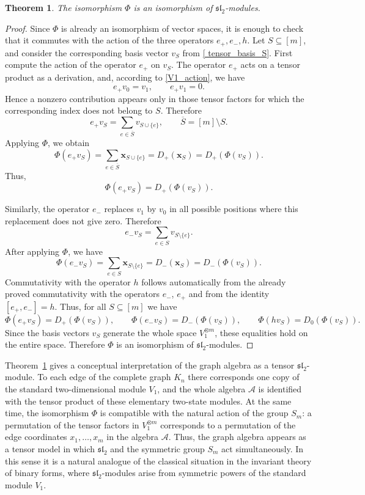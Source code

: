 \documentclass[12pt,reqno]{amsart}
\newtheorem{theorem}{Theorem}[section]
\begin{document}
\begin{theorem}\label{A_tensor_power}
The isomorphism $\Phi$ is an isomorphism of $\mathfrak{sl}_2$-modules.
\end{theorem}

\begin{proof}
Since $\Phi$ is already an isomorphism of vector spaces, it is enough to
check that it commutes with the action of the three operators $e_+,e_-,h$.
Let $S\subseteq[m]$, and consider the corresponding basis vector $v_S$ from
\eqref{ tensor_basis_S}.
First compute the action of the operator $e_+$ on $v_S$.
The operator $e_+$ acts on a tensor product as a derivation, and, according
to \eqref{V1_action}, we have
$$
e_+v_0=v_1,\qquad e_+v_1=0.
$$
Hence a nonzero contribution appears only in those tensor factors for which
the corresponding index does not belong to $S$.
Therefore
$$
e_+v_S=\sum_{e\in \overline S} v_{S\cup\{e\}},
\qquad
\overline S=[m]\setminus S.
$$
Applying $\Phi$, we obtain
$$
\Phi(e_+v_S)=\sum_{e\in\overline S}\boldsymbol{x}_{S\cup\{e\}}=D_+(\boldsymbol{x}_S)=D_+(\Phi(v_S)).
$$
Thus,
$$
\Phi(e_+v_S)=D_+(\Phi(v_S)).
$$

Similarly, the operator $e_-$ replaces $v_1$ by $v_0$ in all possible
positions where this replacement does not give zero.
Therefore
$$
e_-v_S=\sum_{e\in S}v_{S\setminus\{e\}}.
$$
After applying $\Phi$, we have
$$
\Phi(e_-v_S)=\sum_{e\in S}\boldsymbol{x}_{S\setminus\{e\}}=D_-(\boldsymbol{x}_S)=D_-(\Phi(v_S)).
$$
Commutativity with the operator $h$ follows automatically from the already
proved commutativity with the operators $e_-$, $e_+$ and from the identity
$[e_+, e_-]=h$.
Thus, for all $S\subseteq[m]$ we have
$$
\Phi(e_+v_S)=D_+(\Phi(v_S)),\qquad
\Phi(e_-v_S)=D_-(\Phi(v_S)),\qquad
\Phi(hv_S)=D_0(\Phi(v_S)).
$$
Since the basis vectors $v_S$ generate the whole space $V_1^{\otimes m}$,
these equalities hold on the entire space.
Therefore $\Phi$ is an isomorphism of $\mathfrak{sl}_2$-modules.
\end{proof}

Theorem~\ref{A_tensor_power} gives a conceptual interpretation of the
graph algebra as a tensor $\mathfrak{sl}_2$-module. To each edge of the
complete graph $K_n$ there corresponds one copy of the standard two-dimensional
module $V_1$, and the whole algebra $\mathcal A$ is identified with the
tensor product of these elementary two-state modules. At the same time, the
isomorphism $\Phi$ is compatible with the natural action of the group $S_m$:
a permutation of the tensor factors in $V_1^{\otimes m}$ corresponds to a
permutation of the edge coordinates $x_1,\dots,x_m$ in the algebra
$\mathcal A$. Thus, the graph algebra appears as a tensor model in which
$\mathfrak{sl}_2$ and the symmetric group $S_m$ act simultaneously. In this
sense it is a natural analogue of the classical situation in the invariant
theory of binary forms, where $\mathfrak{sl}_2$-modules arise from symmetric
powers of the standard module $V_1$.
\end{document}
